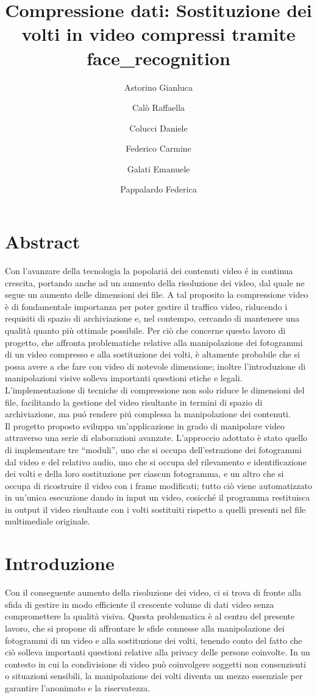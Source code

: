 \documentclass{report}
\title{Compressione dati: Sostituzione dei volti in video compressi tramite face\_recognition}
\author{Astorino Gianluca \and Calò Raffaella \and  Colucci Daniele \and  Federico Carmine \and Galati Emanuele \and Pappalardo Federica}
\begin{document}
\maketitle

\thispagestyle{empty}
\thispagestyle{empty}
\chapter*{Abstract}
Con l’avanzare della tecnologia la popolariá dei contenuti video é in continua crescita, portando anche ad un aumento della risoluzione dei video, dal quale ne segue un aumento delle dimensioni dei file. A tal proposito la compressione video è di fondamentale importanza per poter gestire il traffico video, riducendo i requisiti di spazio di archiviazione e, nel contempo, cercando di mantenere una qualità quanto più ottimale possibile. Per ciò che concerne questo lavoro di progetto, che affronta problematiche relative alla manipolazione dei fotogrammi di un video compresso e alla sostituzione dei volti, è altamente probabile che si possa avere a che fare con video di notevole dimensione; inoltre l’introduzione di manipolazioni visive solleva importanti questioni etiche e legali. L’implementazione di tecniche di compressione non solo riduce le dimensioni del file, facilitando la gestione del video risultante in termini di spazio di archiviazione, ma puó rendere piú complessa la manipolazione dei contenuti. \\

Il progetto proposto sviluppa un’applicazione in grado di manipolare video attraverso una serie di elaborazioni avanzate. L’approccio adottato è stato quello di implementare tre “moduli”, uno che si occupa dell’estrazione dei fotogrammi dal video e del relativo audio, uno che si occupa del rilevamento e identificazione dei volti e della loro sostituzione per ciascun fotogramma, e un altro che si occupa di ricostruire il video con i frame modificati; tutto ciò viene automatizzato in un’unica esecuzione dando in input un video, cosicché il programma restituisca in output il video risultante con i volti sostituiti rispetto a quelli presenti nel file multimediale originale.


\thispagestyle{empty}
\tableofcontents
\thispagestyle{empty}

\chapter{Introduzione}

Con il conseguente aumento della risoluzione dei video, ci si trova di fronte alla sfida di gestire in modo efficiente il crescente volume di dati video senza compromettere la qualità visiva. Questa problematica è al centro del presente lavoro, che si propone di affrontare le sfide connesse alla manipolazione dei fotogrammi di un video e alla sostituzione dei volti, tenendo conto del fatto che ciò solleva importanti questioni relative alla privacy delle persone coinvolte. In un contesto in cui la condivisione di video può coinvolgere soggetti non consenzienti o situazioni sensibili, la manipolazione dei volti diventa un mezzo essenziale per garantire l’anonimato e la riservatezza.
\end{document}
